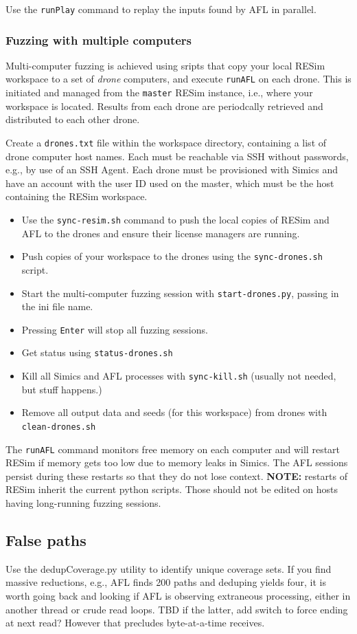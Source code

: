 \documentclass[titlepage]{article}
\begin{document}
Use the {\tt runPlay} command to replay the inputs found by AFL in parallel.

\subsubsection{Fuzzing with multiple computers}
\label{fuzz-drones}
Multi-computer fuzzing is achieved using sripts that copy your local RESim workspace to a set of \textit{drone} computers,
and execute {\tt runAFL} on each drone.  This is initiated and managed from the {\tt master} RESim instance, i.e., where your 
workspace is located.  Results from each drone are periodcally retrieved and distributed to each other drone.

Create a {\tt drones.txt} file within the workspace directory, containing a list of drone computer host names.  Each must be reachable
via SSH without passwords, e.g., by use of an SSH Agent.  Each drone must be provisioned with Simics and have an account with the user ID used
on the master, which must be the host containing the RESim workspace. 
\begin{itemize}
\item Use the {\tt sync-resim.sh} command to push the local copies of RESim and AFL to the drones and ensure their license managers are running.
\item Push copies of your workspace to the drones using the {\tt sync-drones.sh} script.
\item Start the multi-computer fuzzing session with {\tt start-drones.py}, passing in the ini file name.
\item Pressing {\tt Enter} will stop all fuzzing sessions.
\item Get status using {\tt status-drones.sh}
\item Kill all Simics and AFL processes with {\tt sync-kill.sh} (usually not needed, but stuff happens.)
\item Remove all output data and seeds (for this workspace) from drones with {\tt clean-drones.sh}
\end{itemize}

The {\tt runAFL} command monitors free memory on each computer and will restart RESim if memory gets too low due to
memory leaks in Simics.  The AFL sessions persist during these restarts so that they do not lose context.  \textbf{NOTE:} restarts of RESim
inherit the current python scripts.  Those should not be edited on hosts having long-running fuzzing sessions.

\subsection{False paths}
Use the dedupCoverage.py utility to identify unique coverage sets.  If you find massive reductions, e.g., AFL finds 200 paths and
deduping yields four, it is worth going back and looking if AFL is observing extraneous processing, either in another thread or
crude read loops.  TBD if the latter, add switch to force ending at next read?  However that precludes byte-at-a-time receives.
\end{document}
